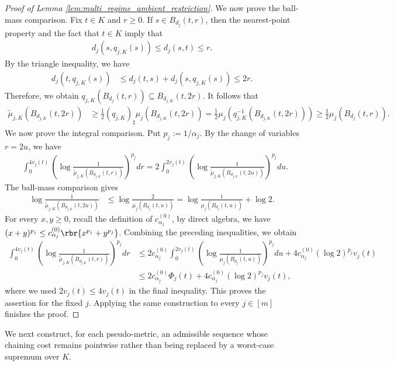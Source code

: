 \documentclass[11pt]{article}
\begin{document}
\begin{proof}[Proof of Lemma
\ref{lem:multi_regime_ambient_restriction}]
We now prove the ball-mass comparison. Fix $t\in K$ and $r\ge0$.
If $s\in B_{d_j}(t,r)$, then the nearest-point property and the fact
that $t\in K$ imply that
\begin{align*}
d_j(s,q_{j,K}(s))
\le
d_j(s,t)
\le r.
\end{align*}
By the triangle inequality, we have
\begin{align*}
d_j(t,q_{j,K}(s))
&\le
d_j(t,s)+d_j(s,q_{j,K}(s))
\le2r.
\end{align*}
Therefore, we obtain $q_{j,K}(B_{d_j}(t,r))
\subseteq
B_{d_{j,K}}(t,2r)$.
It follows that
\begin{align*}
\widetilde\mu_{j,K}(B_{d_{j,K}}(t,2r))
&\ge
\frac12(q_{j,K})_\sharp\mu_j(B_{d_{j,K}}(t,2r))=
\frac12\mu_j(q_{j,K}^{-1}(B_{d_{j,K}}(t,2r)))
\ge
\frac12\mu_j(B_{d_j}(t,r)).
\end{align*}
We now prove the integral comparison. Put
$p_j:=1/\alpha_j$. By the change of variables $r=2u$, we have
\begin{align*}
&\int_0^{4v_j(t)}
\left(
\log\frac{1}{
\widetilde\mu_{j,K}(B_{d_{j,K}}(t,r))
}
\right)^{p_j}dr=
2\int_0^{2v_j(t)}
\left(
\log\frac{1}{
\widetilde\mu_{j,K}(B_{d_{j,K}}(t,2u))
}
\right)^{p_j}du.
\end{align*}
The ball-mass comparison gives
\begin{align*}
\log\frac{1}{
\widetilde\mu_{j,K}(B_{d_{j,K}}(t,2u))
}
&\le
\log\frac{2}{\mu_j(B_{d_j}(t,u))}=
\log\frac{1}{\mu_j(B_{d_j}(t,u))}
+
\log2.
\end{align*}
For every $x,y\ge0$, recall the definition of $c_{\alpha_j}^{(0)}$, by direct algebra, we have
$(x+y)^{p_j}
\le
c_{\alpha_j}^{(0)}
\rbr{x^{p_j}+y^{p_j}}$.
Combining the preceding inequalities, we obtain
\begin{align*}
\int_0^{4v_j(t)}
\left(
\log\frac{1}{
\widetilde\mu_{j,K}(B_{d_{j,K}}(t,r))
}
\right)^{p_j}dr&\le
2c_{\alpha_j}^{(0)}
\int_0^{2v_j(t)}
\left(
\log\frac{1}{\mu_j(B_{d_j}(t,u))}
\right)^{p_j}du
+
4c_{\alpha_j}^{(0)}
(\log2)^{p_j}v_j(t)\\
&\le
2c_{\alpha_j}^{(0)}\Phi_j(t)
+
4c_{\alpha_j}^{(0)}
(\log2)^{p_j}v_j(t),
\end{align*}
where we used $2v_j(t)\le4v_j(t)$ in the final inequality. This
proves the assertion for the fixed $j$. Applying the same construction
to every $j\in[m]$ finishes the proof.
\end{proof}

We next construct, for each pseudo-metric, an admissible sequence whose
chaining cost remains pointwise rather than being replaced by a worst-case
supremum over $K$.
\end{document}
